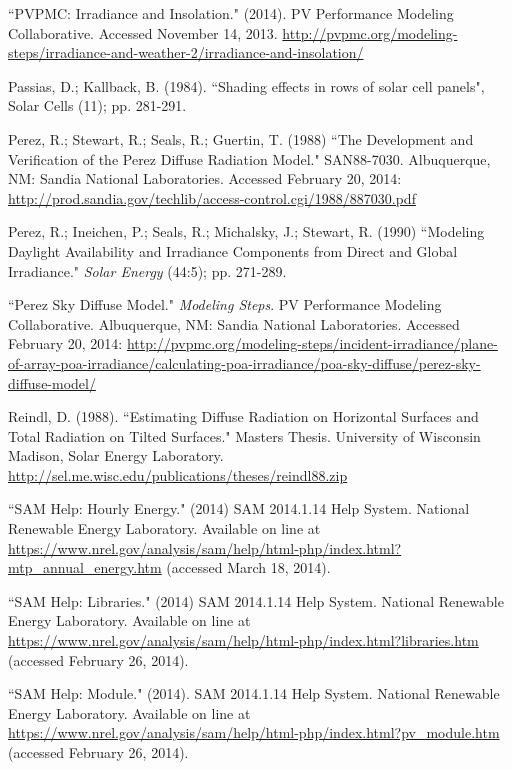\documentclass[12pt,letterpaper]{article}
\begin{document}
\begin{thebibliography}{99}
 ``PVPMC: Irradiance and Insolation." (2014). PV Performance Modeling Collaborative. Accessed November 14, 2013. \url{http://pvpmc.org/modeling-steps/irradiance-and-weather-2/irradiance-and-insolation/}

 Passias, D.; Kallback, B.  (1984). ``Shading effects in rows of solar cell panels", Solar Cells (11); pp. 281-291.

 Perez, R.; Stewart, R.; Seals, R.; Guertin, T. (1988) ``The Development and Verification of the Perez Diffuse Radiation Model." SAN88-7030. Albuquerque, NM: Sandia National Laboratories. Accessed February 20, 2014: \url{http://prod.sandia.gov/techlib/access-control.cgi/1988/887030.pdf}

 Perez, R.; Ineichen, P.; Seals, R.; Michalsky, J.; Stewart, R. (1990) ``Modeling Daylight Availability and Irradiance Components from Direct and Global Irradiance." \textit{Solar Energy} (44:5); pp. 271-289.

 ``Perez Sky Diffuse Model."  \textit{Modeling Steps}. PV Performance Modeling Collaborative. Albuquerque, NM: Sandia National Laboratories.  Accessed February 20, 2014: \url{http://pvpmc.org/modeling-steps/incident-irradiance/plane-of-array-poa-irradiance/calculating-poa-irradiance/poa-sky-diffuse/perez-sky-diffuse-model/}

 Reindl, D. (1988). ``Estimating Diffuse Radiation on Horizontal Surfaces and Total Radiation on Tilted Surfaces." Masters Thesis. University of Wisconsin Madison, Solar Energy Laboratory. \url{http://sel.me.wisc.edu/publications/theses/reindl88.zip}

 ``SAM Help: Hourly Energy." (2014) SAM 2014.1.14 Help System. National Renewable Energy Laboratory. Available on line at \url{https://www.nrel.gov/analysis/sam/help/html-php/index.html?mtp_annual_energy.htm} (accessed March 18, 2014).

 ``SAM Help: Libraries." (2014) SAM 2014.1.14 Help System. National Renewable Energy Laboratory. Available on line at \url{https://www.nrel.gov/analysis/sam/help/html-php/index.html?libraries.htm} (accessed February 26, 2014).

 ``SAM Help: Module." (2014). SAM 2014.1.14 Help System. National Renewable Energy Laboratory. Available on line at \url{https://www.nrel.gov/analysis/sam/help/html-php/index.html?pv_module.htm} (accessed February 26, 2014).


\end{thebibliography}
\end{document}

